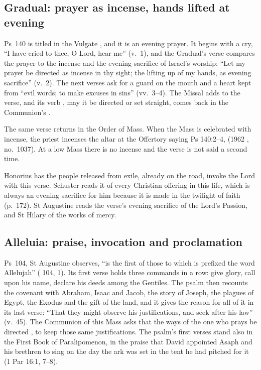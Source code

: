 \subsection{Gradual: prayer as incense, hands lifted at evening}

Ps~140 is titled in the Vulgate , and it is an evening
prayer. It begins with a cry, ``I have cried to thee, O Lord, hear me'' (v.~1),
and the Gradual's verse compares the prayer to the incense and the evening
sacrifice of Israel's worship: ``Let my prayer be directed as incense in thy
sight; the lifting up of my hands, as evening sacrifice'' (v.~2). The next
verses ask for a guard on the mouth and a heart kept from ``evil words; to make
excuses in sins'' (vv.~3--4). The Missal adds  to the verse, and
its verb , may it be directed or set straight, comes back in
the Communion's .

The same verse returns in the Order of Mass. When the Mass is celebrated with
incense, the priest incenses the altar at the Offertory saying Ps 140:2--4,
 (1962 ,
no.~1037). At a low Mass there is no incense and the verse is not said a second
time.

Honorius has the people released from exile, already on the road, invoke the
Lord with this verse. Schuster reads it of every Christian offering in this
life, which is always an evening sacrifice for him because it is made in the
twilight of faith (p.~172). St Augustine reads the verse's evening sacrifice of
the Lord's Passion, and St Hilary of the works of mercy.

\subsection{Alleluia: praise, invocation and proclamation}

Ps~104, St Augustine observes, ``is the first of those to which is prefixed
the word Allelujah'' ( 104, 1). Its first verse holds three
commands in a row: give glory, call upon his name,
declare his deeds among the Gentiles. The psalm then recounts the covenant with
Abraham, Isaac and Jacob, the story of Joseph, the plagues of Egypt, the
Exodus and the gift of the land, and it gives the reason for all of it in its
last verse: ``That they might observe his justifications, and seek after his
law'' (v.~45). The Communion of this Mass asks that the ways of the one who prays
be directed , to keep those same
justifications. The psalm's first verses stand also in the First Book of
Paralipomenon, in the praise that David appointed Asaph and his brethren to
sing on the day the ark was set in the tent he had pitched for it (1 Par 16:1,
7--8).

